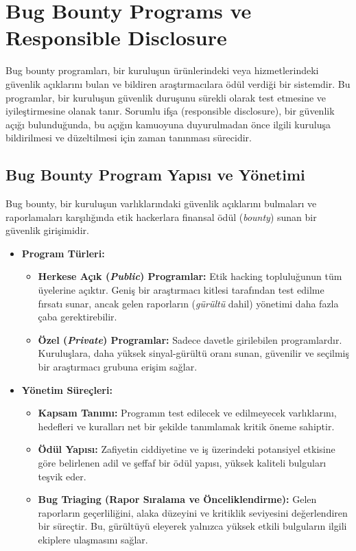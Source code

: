 \section{Bug Bounty Programs ve Responsible Disclosure}

Bug bounty programları, bir kuruluşun ürünlerindeki veya hizmetlerindeki güvenlik açıklarını bulan ve bildiren araştırmacılara ödül verdiği bir sistemdir. Bu programlar, bir kuruluşun güvenlik duruşunu sürekli olarak test etmesine ve iyileştirmesine olanak tanır. Sorumlu ifşa (responsible disclosure), bir güvenlik açığı bulunduğunda, bu açığın kamuoyuna duyurulmadan önce ilgili kuruluşa bildirilmesi ve düzeltilmesi için zaman tanınması sürecidir.

\subsection{Bug Bounty Program Yapısı ve Yönetimi}

Bug bounty, bir kuruluşun varlıklarındaki güvenlik açıklarını bulmaları ve raporlamaları karşılığında etik hackerlara finansal ödül (\textit{bounty}) sunan bir güvenlik girişimidir.

\begin{itemize}
\item \textbf{Program Türleri:}
\begin{itemize}
\item \textbf{Herkese Açık (\textit{Public}) Programlar:} Etik hacking topluluğunun tüm üyelerine açıktır. Geniş bir araştırmacı kitlesi tarafından test edilme fırsatı sunar, ancak gelen raporların (\textit{gürültü} dahil) yönetimi daha fazla çaba gerektirebilir.
\item \textbf{Özel (\textit{Private}) Programlar:} Sadece davetle girilebilen programlardır. Kuruluşlara, daha yüksek sinyal-gürültü oranı sunan, güvenilir ve seçilmiş bir araştırmacı grubuna erişim sağlar.
\end{itemize}
\item \textbf{Yönetim Süreçleri:}
\begin{itemize}
\item \textbf{Kapsam Tanımı:} Programın test edilecek ve edilmeyecek varlıklarını, hedefleri ve kuralları net bir şekilde tanımlamak kritik öneme sahiptir.
\item \textbf{Ödül Yapısı:} Zafiyetin ciddiyetine ve iş üzerindeki potansiyel etkisine göre belirlenen adil ve şeffaf bir ödül yapısı, yüksek kaliteli bulguları teşvik eder.
\item \textbf{Bug Triaging (Rapor Sıralama ve Önceliklendirme):} Gelen raporların geçerliliğini, alaka düzeyini ve kritiklik seviyesini değerlendiren bir süreçtir. Bu, gürültüyü eleyerek yalnızca yüksek etkili bulguların ilgili ekiplere ulaşmasını sağlar.
\end{itemize}
\end{itemize}

